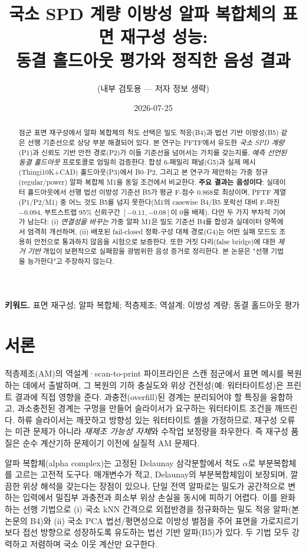 \documentclass[11pt]{article}
\title{국소 SPD 계량 이방성 알파 복합체의 표면 재구성 성능:\\
동결 홀드아웃 평가와 정직한 음성 결과}
\author{(내부 검토용 — 저자 정보 생략)}
\date{2026-07-25}
\begin{document}
\maketitle

\begin{abstract}
점군 표면 재구성에서 알파 복합체의 척도 선택은 밀도 적응(B4)과 법선 기반 이방성(B5)
같은 선행 기준선으로 상당 부분 해결되어 있다. 본 연구는 PFTF에서 유도한 \emph{국소 SPD
계량}(P1)과 신뢰도 기반 안전 경로(P2)가 이들 기준선을 넘어서는 가치를 갖는지를,
\emph{예측 선언된 동결 홀드아웃} 프로토콜로 엄밀히 검증한다. 합성 6-패밀리 패널(G5)과
실제 메시(Thingi10K$+$CAD) 홀드아웃(P3)에서 B0--P2, 그리고 본 연구가 제안하는 가중
정규(regular/power) 알파 복합체 M1을 동일 조건에서 비교한다. \textbf{주요 결과는 음성이다}:
실데이터 홀드아웃에서 선행 법선 이방성 기준선 B5가 평균 F-점수 0.868로 최상이며, PFTF
계열(P1/P2/M1) 중 어느 것도 B5를 넘지 못한다(M1의 casewise B4/B5 포락선 대비 F-마진
$-0.094$, 부트스트랩 95\% 신뢰구간 $[-0.11,-0.08]$이 0을 배제). 다만 두 가지 부차적
기여가 남는다: (i) \emph{연결성을 바꾸는} 가중 알파 M1은 밀도 기준선 B4를 합성과 실데이터
양쪽에서 엄격히 개선하며, (ii) 배포된 fail-closed 정확-구성 대체 경로(G4)는 어떤 실패
모드도 조용히 안전으로 통과하지 않음을 시험으로 보증한다. 또한 거짓 다리(false bridge)에
대한 \emph{제거 기반} 개입이 보편적으로 실패함을 광범위한 음성 증거로 정리한다. 본 논문은
"선행 기법을 능가한다"고 주장하지 않는다.
\end{abstract}

\noindent\textbf{키워드.} 표면 재구성; 알파 복합체; 적층제조; 역설계; 이방성 계량;
동결 홀드아웃 평가

\section{서론}
적층제조(AM)의 역설계·scan-to-print 파이프라인은 스캔 점군에서 표면 메시를 복원하는
데에서 출발하며, 그 복원의 기하 충실도와 위상 건전성(예: 워터타이트성)은 프린트 결과에
직접 영향을 준다. 과충전(overfill)된 경계는 분리되어야 할 특징을 융합하고, 과소충전된
경계는 구멍을 만들어 슬라이서가 요구하는 워터타이트 조건을 깨뜨린다. 하류 슬라이서는
깨끗하고 방향성 있는 워터타이트 셸을 가정하므로, 재구성 오류는 미관 문제가 아니라
\emph{재제조 가능성 자체}와 수작업 보정량을 좌우한다. 즉 재구성 품질은 순수 계산기하
문제이기 이전에 실질적 AM 문제다.

알파 복합체(alpha complex)는 고정된 Delaunay 삼각분할에서 척도 $\alpha$로 부분복합체를
고르는 고전적 도구다. 매개변수가 적고, Delaunay의 부분복합체임이 보장되며, 깔끔한 위상
해석을 갖는다는 장점이 있으나, 단일 전역 알파로는 밀도가 공간적으로 변하는 입력에서
밀집부 과충전과 희소부 위상 손실을 동시에 피하기 어렵다. 이를 완화하는 선행 기법으로
(i) 국소 kNN 간격으로 외접반경을 정규화하는 밀도 적응 알파(본 논문의 B4)와 (ii) 국소
PCA 법선/평면성으로 이방성 벌점을 주어 표면을 가로지르기보다 접선 방향으로 성장하도록
유도하는 법선 기반 알파(B5)가 있다. 두 기법 모두 강력하고 저렴하며 국소 이웃 계산만
요구한다.
\end{document}

